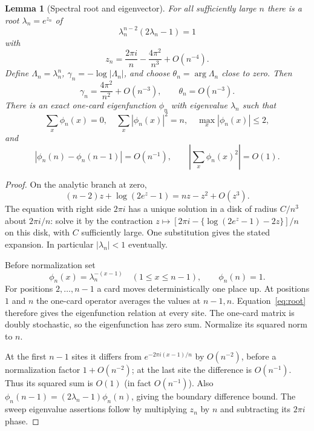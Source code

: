 \documentclass[11pt]{article}
\newtheorem{lemma}[theorem]{Lemma}
\theoremstyle{remark}
\begin{document}
\begin{lemma}[Spectral root and eigenvector]\label{lem:root}
For all sufficiently large $n$ there is a root $\lambda_n=e^{z_n}$ of
\begin{equation}\label{eq:root}
 \lambda_n^{n-2}(2\lambda_n-1)=1
\end{equation}
with
\[
 z_n=\frac{2\pi i}{n}-\frac{4\pi^2}{n^3}+O(n^{-4}).
\]
Define $\Lambda_n=\lambda_n^n$, $\gamma_n=-\log|\Lambda_n|$, and choose
$\theta_n=\arg\Lambda_n$ close to zero. Then
\[
 \gamma_n=\frac{4\pi^2}{n^2}+O(n^{-3}),\qquad\theta_n=O(n^{-3}).
\]
There is an exact one-card eigenfunction $\phi_n$ with eigenvalue $\lambda_n$ such that
\begin{equation}\label{eq:phi}
 \sum_x\phi_n(x)=0,\quad \sum_x|\phi_n(x)|^2=n,\quad
 \max_x|\phi_n(x)|\leq2,
\end{equation}
and
\begin{equation}\label{eq:phismall}
 \left|\phi_n(n)-\phi_n(n-1)\right|=O(n^{-1}),\qquad
 \left|\sum_x\phi_n(x)^2\right|=O(1).
\end{equation}
\end{lemma}
\begin{proof}
On the analytic branch at zero,
\[
 (n-2)z+\log(2e^z-1)=nz-z^2+O(z^3).
\]
The equation with right side $2\pi i$ has a unique solution in a disk of radius $C/n^3$ about $2\pi i/n$: solve it by the contraction
$z\mapsto[2\pi i-\{\log(2e^z-1)-2z\}]/n$ on this disk, with $C$ sufficiently large. One substitution gives the stated expansion. In particular $|\lambda_n|<1$ eventually.

Before normalization set
\[
 \phi_n(x)=\lambda_n^{-(x-1)}\quad(1\leq x\leq n-1),\qquad\phi_n(n)=1.
\]
For positions $2,\ldots,n-1$ a card moves deterministically one place up. At positions $1$ and $n$ the one-card operator averages the values at $n-1,n$. Equation~\eqref{eq:root} therefore gives the eigenfunction relation at every site. The one-card matrix is doubly stochastic, so the eigenfunction has zero sum. Normalize its squared norm to $n$.

At the first $n-1$ sites it differs from $e^{-2\pi i(x-1)/n}$ by $O(n^{-2})$, before a normalization factor $1+O(n^{-2})$; at the last site the difference is $O(n^{-1})$. Thus its squared sum is $O(1)$ (in fact $O(n^{-1})$). Also
$\phi_n(n-1)=(2\lambda_n-1)\phi_n(n)$, giving the boundary difference bound. The sweep eigenvalue assertions follow by multiplying $z_n$ by $n$ and subtracting its $2\pi i$ phase.
\end{proof}
\end{document}
